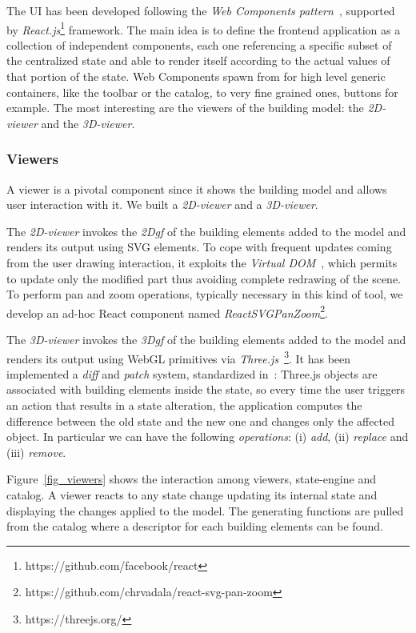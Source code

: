 The UI has been developed following the \emph{Web Components pattern}~\cite{CITARE-QUALCOSA}, supported by \emph{React.js}\footnote{https://github.com/facebook/react} framework. The main idea is to define the frontend application as a collection of independent components, each one referencing a specific subset of the centralized state and able to render itself according to the actual values of that portion of the state. Web Components spawn from for high level generic containers, like the toolbar or the catalog, to very fine grained ones, buttons for example. The most interesting are the viewers of the building model: the \emph{2D-viewer} and the \emph{3D-viewer}.

\subsubsection*{Viewers} A viewer is a pivotal component since it shows the building model and allows user interaction with it. We built a \emph{2D-viewer} and a \emph{3D-viewer}. 

The \emph{2D-viewer} invokes the \emph{2Dgf} of the building elements added to the model and renders its output using SVG elements. To cope with frequent updates coming from the user drawing interaction, it exploits the \emph{Virtual DOM}~\cite{vdom}, which permits to update only the modified part thus avoiding complete redrawing of the scene. To perform pan and zoom operations, typically necessary in this kind of tool, we develop an ad-hoc React component named \emph{ReactSVGPanZoom}\footnote{https://github.com/chrvadala/react-svg-pan-zoom}.

The \emph{3D-viewer} invokes the \emph{3Dgf} of the building elements added to the model and renders its output using WebGL primitives via \emph{Three.js}~\footnote{https://threejs.org/}. It has been implemented a \emph{diff} and \emph{patch} system, standardized in~\cite{rfc6902}: Three.js objects are associated with building elements inside the state, so every time the user triggers an action that results in a state alteration, the application computes the difference between the old state and the new one and changes only the affected object. In particular we can have the following \textit{operations}: (i) \emph{add}, (ii) \emph{replace} and (iii) \emph{remove}.


Figure~\ref{fig_viewers} shows the interaction among viewers, state-engine and catalog. A viewer reacts to any state change updating its internal state and displaying the changes applied to the model. The generating functions are pulled from the catalog where a descriptor for each building elements can be found.


